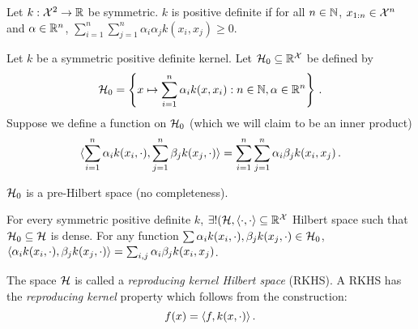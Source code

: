 \documentclass[twoside]{article}
\newcommand{\set}[1]{\left\{#1\right\}}
\begin{document}
\begin{definition}
    Let $k: \mathcal{X}^2 \to \mathbb{R}$ be symmetric. $k$ is positive definite if for all $n \in \mathbb{N}$, $x_{1:n} \in \mathcal{X}^n$ and $\alpha \in \mathbb{R}^n$, $\sum_{i=1}^n \sum_{j=1}^n \alpha_i \alpha_j k(x_i, x_j) \ge 0$.
\end{definition}

Let $k$ be a symmetric positive definite kernel. Let $\mathcal{H}_0 \subseteq \mathbb{R}^{\mathcal{X}}$ be defined by
\[
    \cH_0 = \set{x \mapsto \sum_{i=1}^n \alpha_i k(x, x_i) : n \in \NN, \alpha \in \R^n}\,.
\]
Suppose we define a function on $\mathcal{H}_0$ (which we will claim to be an inner product)
\[
\langle \sum_{i=1}^n \alpha_i k(x_i, \cdot), \sum_{j=1}^n \beta_j k(x_j, \cdot) \rangle = \sum_{i=1}^n \sum_{j=1}^n \alpha_i \beta_j k(x_i, x_j) \,.
\]

\begin{claim}
    $\mathcal{H}_0$ is a pre-Hilbert space (no completeness).
\end{claim}

\begin{theorem}
    For every symmetric positive definite $k$,  $\exists ! (\mathcal{H}, \langle \cdot, \cdot \rangle \subseteq \mathbb{R}^{\mathcal{X}}$ Hilbert space such that $\mathcal{H}_0 \subseteq \mathcal{H}$ is dense. For any function $\sum \alpha_i k(x_i, \cdot), \beta_j k(x_j, \cdot) \in \mathcal{H}_0$, $\langle \alpha_i k(x_i, \cdot), \beta_j k(x_j, \cdot) \rangle = \sum_{i,j} \alpha_i \beta_j k(x_i, x_j)$.
\end{theorem}
The space $\mathcal{H}$ is called a \emph{reproducing kernel Hilbert space} (RKHS). A RKHS has the \emph{reproducing kernel} property which follows from the construction:
\[
    f(x) = \langle f, k(x,\cdot) \rangle \,.
\]
 
\end{document}
